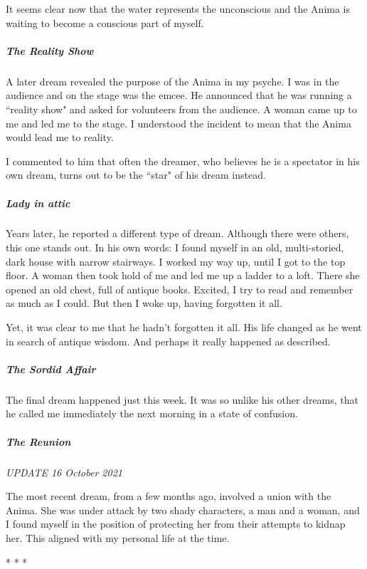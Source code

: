It seems clear now that the water represents the unconscious and the Anima is waiting to become a conscious part of
myself.

\subparagraph{The Reality Show}
A later dream revealed the purpose of the Anima in my psyche. I was in the audience and on the stage was the emcee. He
announced that he was running a ``reality show" and asked for volunteers from the audience. A woman came up to me and
led me to the stage. I understood the incident to mean that the Anima would lead me to reality.

I commented to him that often the dreamer, who believes he is a spectator in his own dream, turns out to be the ``star"
of his dream instead.

\subparagraph{Lady in attic}
Years later, he reported a different type of dream. Although there were others, this one stands out. In his own words: I
found myself in an old, multi-storied, dark house with narrow stairways. I worked my way up, until I got to the top
floor. A woman then took hold of me and led me up a ladder to a loft. There she opened an old chest, full of antique
books. Excited, I try to read and remember as much as I could. But then I woke up, having forgotten it all.

Yet, it was clear to me that he hadn't forgotten it all. His life changed as he went in search of
antique wisdom. And perhaps it really happened as described.

\subparagraph{The Sordid Affair}
The final dream happened just this week. It was so unlike his other dreams, that he called me immediately the next
morning in a state of confusion.

\subparagraph{The Reunion}
\textit{UPDATE 16 October 2021}

The most recent dream, from a few months ago, involved a union with the Anima. She was under attack by two shady
characters, a man and a woman, and I found myself in the position of protecting her from their attempts to kidnap her.
This aligned with my personal life at the time.




\begin{center}* * *\end{center}

